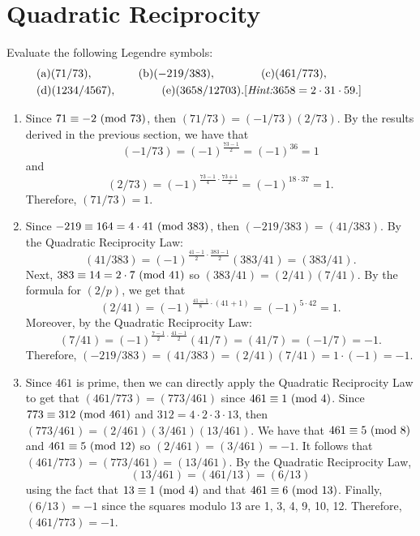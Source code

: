 \section{Quadratic Reciprocity}

\begin{exercise}
    Evaluate the following Legendre symbols:
    \begin{align*}
        &\text{(a)} (71/73), \qquad \qquad \text{(b)} (-219/383), \qquad\qquad \text{(c)} (461/773), &&&& \\
        &\text{(d)} (1234/4567), \qquad \qquad \text{(e)} (3658/12703). [\textit{Hint:} 3658 = 2\cdot 31 \cdot 59.] &&&& \\
    \end{align*}
\end{exercise}

\begin{solution}
    \begin{enumerate}
        \item Since $71 \equiv -2 \ (\mathrm{mod}\ 73)$, then $(71/73) = (-1/73)(2/73)$. By the results derived in the previous section, we have that
        $$(-1/73) = (-1)^{\frac{73 - 1}{2}} = (-1)^{36} = 1$$
        and
        $$(2/73) = (-1)^{\frac{73-1}{4}\cdot \frac{73 + 1}{2}} = (-1)^{18\cdot 37} = 1.$$
        Therefore, $(71/73) = 1$.
        \item Since $-219 \equiv 164 = 4\cdot 41 \ (\mathrm{mod}\ 383)$, then $(-219/383) = (41/383)$. By the Quadratic Reciprocity Law:
        $$(41/383) = (-1)^{\frac{41-1}{2}\cdot \frac{383 - 1}{2}}(383/41) = (383/41).$$
        Next, $383 \equiv 14 = 2\cdot 7 \ (\mathrm{mod}\ 41)$ so $(383/41) = (2/41)(7/41)$. By the formula for $(2/p)$, we get that
        $$(2/41) = (-1)^{\frac{41 - 1}{8}\cdot (41 + 1)} = (-1)^{5\cdot 42} = 1.$$
        Moreover, by the Quadratic Reciprocity Law:
        $$(7/41) = (-1)^{\frac{7-1}{2}\cdot \frac{41 - 1}{2}}(41/7) = (41/7) = (-1/7) = -1.$$
        Therefore, $(-219/383) = (41/383) = (2/41)(7/41) = 1\cdot (-1) = -1$.
        \item Since $461$ is prime, then we can directly apply the Quadratic Reciprocity Law to get that $(461/773) = (773/461)$ since $461 \equiv 1 \ (\mathrm{mod}\ 4)$. Since $773 \equiv 312 \ (\mathrm{mod}\ 461)$ and $312 = 4 \cdot 2 \cdot 3 \cdot 13$, then $(773/461) = (2/461)(3/461)(13/461)$. We have that $461 \equiv 5 \ (\mathrm{mod}\ 8)$ and $461 \equiv 5 \ (\mathrm{mod}\ 12)$ so $(2/461) = (3/461) = -1$. It follows that $(461/773) = (773/461) = (13/461)$. By the Quadratic Reciprocity Law, 
        $$(13/461) = (461/13) = (6/13)$$
        using the fact that $13 \equiv 1 \ (\mathrm{mod}\ 4)$ and that $461 \equiv 6 \ (\mathrm{mod}\ 13)$. Finally, $(6/13) = -1$ since the squares modulo 13 are 1, 3, 4, 9, 10, 12. Therefore, $(461/773) = -1$.

\end{enumerate}
\end{solution}
